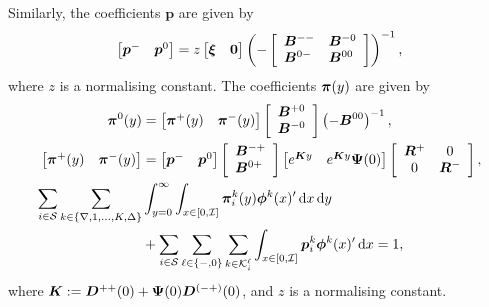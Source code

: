 Similarly, the coefficients \( {\boldsymbol{p}}\) are given by 
	\begin{equation}\begin{bmatrix} \boldsymbol{p}^{-}  & \boldsymbol{p}^{0} \end{bmatrix} = z \begin{bmatrix} {\boldsymbol\xi} & \boldsymbol{0} \end{bmatrix} 
	\left(-\left[\begin{array}{ll} 
		{\boldsymbol B}^{--} & {\boldsymbol B}^{-0} \\
		{\boldsymbol B}^{0-} & {\boldsymbol B}^{00} 
		\end{array} \right] \right)^{-1},\label{eqn:pisystem1}\end{equation}
		where \(z\) is a normalising constant. The coefficients \(\boldsymbol \pi(y)\) are given by 
\begin{align} 
	\;  {\boldsymbol{\pi}}^{0}(y) &= \begin{bmatrix}  {\boldsymbol{\pi}}^{+}(y) &  {\boldsymbol{\pi}}^{-}(y) \end{bmatrix}\left[\begin{array}{l} { {\boldsymbol B}}^{+0} \\ { {\boldsymbol B}}^{-0} \end{array} \right]\left(-{ {\boldsymbol B}}^{00}\right)^{-1}, \\ 
	 \begin{bmatrix}  {\boldsymbol{\pi}}^{+}(y) &  {\boldsymbol{\pi}}^{-}(y) \end{bmatrix}& = \begin{bmatrix}  {\boldsymbol{p}}^{-} &  {\boldsymbol{p}}^{0} \end{bmatrix}\left[\begin{array}{l} { {\boldsymbol B}}^{-+} \\ { {\boldsymbol B}}^{0+} \end{array} \right]\begin{bmatrix} e^{ {\boldsymbol K}y} & e^{ {\boldsymbol K}y}\boldsymbol \Psi(0) \end{bmatrix}\left[\begin{array}{cc}  {\boldsymbol R}^{+} & 0 \\ 0 &  {\boldsymbol R}^{-}\end{array}\right], \\
	 \sum_{i \in \mathcal{S}}\sum_{k \in \{\nabla,1,...,K,\Delta\}} & \int_{y = 0}^{\infty} \int_{x \in [0,\mathcal I]}  \boldsymbol \pi_{i}^{k}(y)\boldsymbol\phi^k(x)'{}\, \mathrm{d} x\, \mathrm{d} y 
	 \\&{}+  \sum_{i \in \mathcal{S}}\sum_{\ell \in \{-,0\}}\sum_{k\in \mathcal K_i^\ell}  \int_{x \in [0,\mathcal I]}  \boldsymbol p^{k}_{i}\boldsymbol\phi^k(x)'{}\, \mathrm{d} x = 1,\label{eqn:pisystem2}
	\end{align}
	where $ {\boldsymbol K} :=  {\boldsymbol D}^{++}(0) + \boldsymbol \Psi(0) {\boldsymbol D}^{(-+)}(0)$, and $z$ is a normalising constant.

